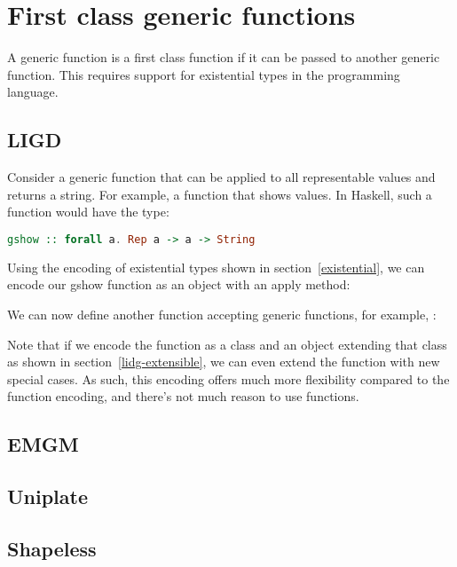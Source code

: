\section{First class generic functions}

A generic function is a first class function if it can be passed to another
generic function. This requires support for existential types in the programming
language.

\subsection{LIGD}

Consider a generic function that can be applied to all representable values
and returns a string. For example, a function  that shows values.
In Haskell, such a function would have the type:
\begin{lstlisting}[language=Haskell]
gshow :: forall a. Rep a -> a -> String
\end{lstlisting}

Using the encoding of existential types shown in section~\ref{existential},
we can encode our gshow function as an object with an apply method:

We can now define another function accepting generic functions, for example, :


Note that if we encode the function as a class and an object extending that
class as shown in section~\ref{lidg-extensible}, we can even extend the
function with new special cases. As such, this encoding offers much more
flexibility compared to the function encoding, and there's not much reason
to use functions.

\subsection{EMGM}
\subsection{Uniplate}
\subsection{Shapeless}
